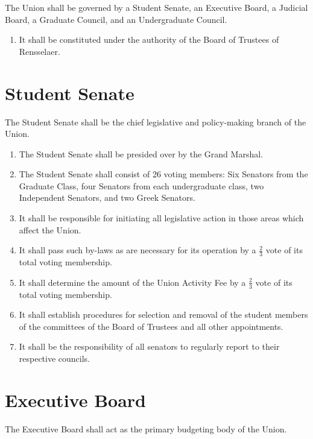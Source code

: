 The Union shall be governed by a Student Senate, an Executive Board, a Judicial Board, a Graduate
Council, and an Undergraduate Council.
\begin{enumerate}
\item It shall be constituted under the authority of the Board of Trustees of Rensselaer.
\end{enumerate}


\section{Student Senate}

The Student Senate shall be the chief legislative and policy-making branch of the Union.

\begin{enumerate}
\item The Student Senate shall be presided over by the Grand Marshal.
\item The Student Senate shall consist of 26 voting members: Six Senators from the Graduate Class, four Senators from each undergraduate class, two Independent Senators, and two Greek Senators.
\item It shall be responsible for initiating all legislative action in those areas which affect the Union.
\item It shall pass such by-laws as are necessary for its operation by a $\frac{2}{3}$ vote of its total voting membership.
\item It shall determine the amount of the Union Activity Fee by a $\frac{2}{3}$ vote of its total voting membership.
\item It shall establish procedures for selection and removal of the student members of the committees of the Board of Trustees and all other appointments.
\item It shall be the responsibility of all senators to regularly report to their respective councils.
\end{enumerate}





\section{Executive Board}

The Executive Board shall act as the primary budgeting body of the Union.


